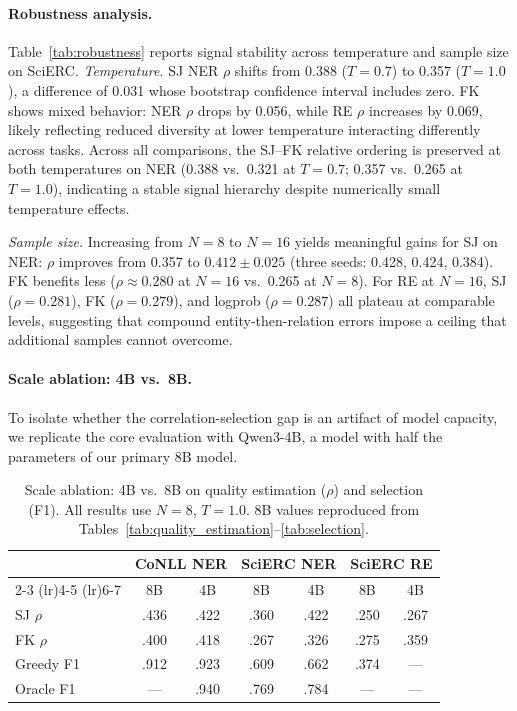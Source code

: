 \paragraph{Robustness analysis.}
Table~\ref{tab:robustness} reports signal stability across temperature and sample size on SciERC.
\textit{Temperature.}
SJ NER $\rho$ shifts from 0.388 ($T{=}0.7$) to 0.357 ($T{=}1.0$), a difference of 0.031 whose bootstrap confidence interval includes zero.
FK shows mixed behavior: NER $\rho$ drops by 0.056, while RE $\rho$ increases by 0.069, likely reflecting reduced diversity at lower temperature interacting differently across tasks.
Across all comparisons, the SJ--FK relative ordering is preserved at both temperatures on NER (0.388 vs.\ 0.321 at $T{=}0.7$; 0.357 vs.\ 0.265 at $T{=}1.0$), indicating a stable signal hierarchy despite numerically small temperature effects.

\textit{Sample size.}
Increasing from $N{=}8$ to $N{=}16$ yields meaningful gains for SJ on NER: $\rho$ improves from 0.357 to $0.412{\pm}0.025$ (three seeds: 0.428, 0.424, 0.384).
FK benefits less ($\rho{\approx}0.280$ at $N{=}16$ vs.\ 0.265 at $N{=}8$).
For RE at $N{=}16$, SJ ($\rho{=}0.281$), FK ($\rho{=}0.279$), and logprob ($\rho{=}0.287$) all plateau at comparable levels, suggesting that compound entity-then-relation errors impose a ceiling that additional samples cannot overcome.

\paragraph{Scale ablation: 4B vs.\ 8B.}
To isolate whether the correlation-selection gap is an artifact of model capacity, we replicate the core evaluation with Qwen3-4B, a model with half the parameters of our primary 8B model.

\begin{table}[t]
\centering
\small
\caption{Scale ablation: 4B vs.\ 8B on quality estimation ($\rho$) and selection (F1). All results use $N{=}8$, $T{=}1.0$. 8B values reproduced from Tables~\ref{tab:quality_estimation}--\ref{tab:selection}.}
\label{tab:scale-ablation}
\begin{tabular}{lcccccc}
\toprule
& \multicolumn{2}{c}{\textbf{CoNLL NER}} & \multicolumn{2}{c}{\textbf{SciERC NER}} & \multicolumn{2}{c}{\textbf{SciERC RE}} \\
\cmidrule(lr){2-3} \cmidrule(lr){4-5} \cmidrule(lr){6-7}
& 8B & 4B & 8B & 4B & 8B & 4B \\
\midrule
SJ $\rho$ & .436 & .422 & .360 & .422 & .250 & .267 \\
FK $\rho$ & .400 & .418 & .267 & .326 & .275 & .359 \\
\midrule
Greedy F1 & .912 & .923 & .609 & .662 & .374 & --- \\
Oracle F1 & ---  & .940 & .769 & .784 & --- & --- \\
\bottomrule
\end{tabular}
\end{table}

